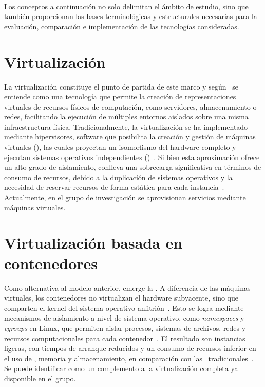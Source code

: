 \label{cap:marcoConceptual}
\mbox{}\\
Los conceptos a continuación no solo delimitan el ámbito de estudio, sino que también proporcionan las bases terminológicas y estructurales necesarias para la evaluación, comparación e implementación de las tecnologías consideradas. 

\section{Virtualización}
\noindent
La virtualización constituye el punto de partida de este marco y según~\citep{AmazonWebServicesInc2023} se entiende como una tecnología que permite la creación de representaciones virtuales de recursos físicos de computación, como servidores, almacenamiento o redes, facilitando la ejecución de múltiples entornos aislados sobre una misma infraestructura física. Tradicionalmente, la virtualización se ha implementado mediante hipervisores, software que posibilita la creación y gestión de máquinas virtuales (\VM), las cuales proyectan un isomorfismo del hardware completo y ejecutan sistemas operativos independientes (\OS)~\citep{KLEIDERMACHER201225}. Si bien esta aproximación ofrece un alto grado de aislamiento, conlleva una sobrecarga significativa en términos de consumo de recursos, debido a la duplicación de sistemas operativos y la necesidad de reservar recursos de forma estática para cada instancia~\citep{bauman2015survey}. Actualmente, en el grupo de investigación se aprovisionan servicios mediante máquinas virtuales.

\section{Virtualización basada en contenedores}
\noindent
Como alternativa al modelo anterior, emerge la \VBC. A diferencia de las máquinas virtuales, los contenedores no virtualizan el hardware subyacente, sino que comparten el kernel del sistema operativo anfitrión~\citep{eder2016hypervisor}. Esto se logra mediante mecanismos de aislamiento a nivel de sistema operativo, como \textit{namespaces} y \textit{cgroups} en Linux, que permiten aislar procesos, sistemas de archivos, redes y recursos computacionales para cada contenedor~\citep{jain2020linux}. El resultado son instancias ligeras, con tiempos de arranque reducidos y un consumo de recursos inferior en el uso de \CPU\;, memoria y almacenamiento, en comparación con las \VM\ tradicionales~\citep{6903537}. Se puede identificar como un complemento a la virtualización completa ya disponible en el grupo.

